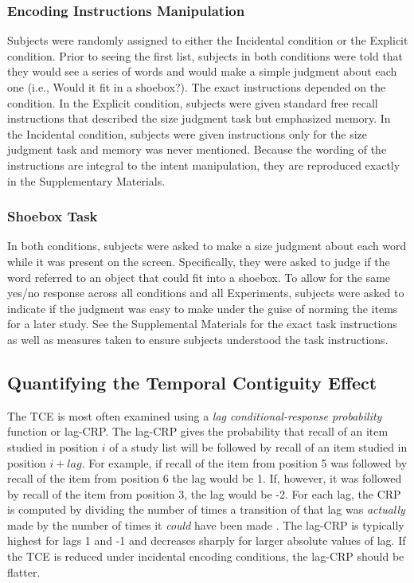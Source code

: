 \documentclass[jou,natbib,floatsintext]{apa6} %
\begin{document}
\subsubsection{Encoding Instructions Manipulation} Subjects were randomly assigned to either the Incidental condition or the Explicit condition. Prior to seeing the first list, subjects in both conditions were told that they would see a series of words and would make a simple judgment about each one (i.e., Would it fit in a shoebox?). The exact instructions depended on the condition. In the Explicit condition, subjects were given standard free recall instructions that described the size judgment task but emphasized memory. In the Incidental condition, subjects were given instructions only for the size judgment task and memory was never mentioned. Because the wording of the instructions are integral to the intent manipulation, they are reproduced exactly in the Supplementary Materials.

\subsubsection{Shoebox Task} In both conditions, subjects were asked to make a size judgment about each word while it was present on the screen. Specifically, they were asked  to judge if the word referred to an object that could fit into a shoebox. To allow for the same yes/no response across all conditions and all Experiments, subjects were asked to indicate if the judgment was easy to make under the guise of norming the items for a later study. See the Supplemental Materials for the exact task instructions as well as measures taken to ensure subjects understood the task instructions.

\subsection{Quantifying the Temporal Contiguity Effect} The TCE is most often examined using a \textit{lag conditional-response probability} function or lag-CRP. The lag-CRP gives the probability that recall of an item studied in position $i$ of a study list will be followed by recall of an item studied in position $i+lag$. For example, if recall of the item from position 5 was followed by recall of the item from position 6 the lag would be 1. If, however, it was followed by recall of the item from position 3, the lag would be -2. For each lag, the CRP is computed by dividing the number of times a transition of that lag was \emph{actually} made by the number of times it \emph{could} have been made \citep[e.g., it could not have been made if the item $i+lag$ was already recalled;][]{Kaha96}. The lag-CRP is typically highest for lags 1 and -1 and decreases sharply for larger absolute values of lag. If the TCE is reduced under incidental encoding conditions, the lag-CRP should be flatter.
\end{document}
